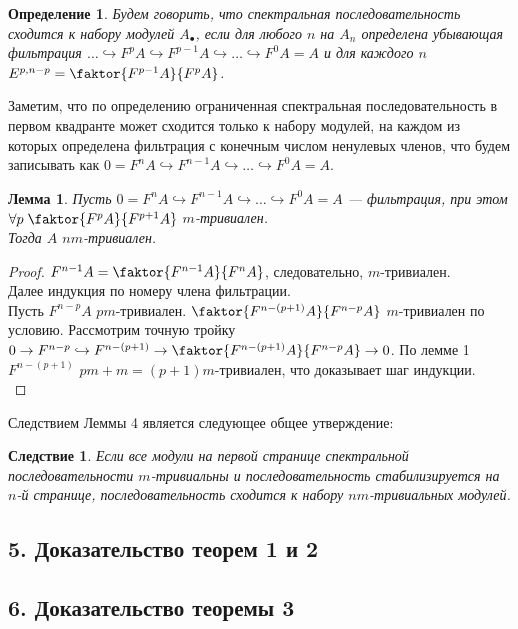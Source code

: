 \documentclass[a4paper,12pt]{report}
\newtheorem{lemma}{Лемма}
\newtheorem{corollary}{Следствие}
\newtheorem{definition}{Определение}
\begin{document}
\begin{definition}
  Будем говорить, что спектральная последовательность сходится к набору модулей $A_{\bullet}$,
  если для любого $n$ на $A_n$ определена убывающая фильтрация $\ldots \hookrightarrow  F^pA \hookrightarrow F^{p-1}A \hookrightarrow \ldots \hookrightarrow F^0A = A$ и для каждого $n$ $E^{p,n-p} = \faktor{F^{p-1}A}{F^pA}$.
\end{definition}

Заметим, что по определению ограниченная спектральная последовательность в первом квадранте может сходится только к набору модулей, на каждом из которых определена фильтрация с конечным числом ненулевых членов, что будем записывать как $0 = F^nA \hookrightarrow F^{n-1}A \hookrightarrow \ldots \hookrightarrow F^0A = A$.

\begin{lemma}
  Пусть $0 = F^nA \hookrightarrow F^{n-1}A \hookrightarrow \ldots \hookrightarrow F^0A = A$ --- фильтрация, при этом $\forall p\; \faktor{F^pA}{F^{p+1}A}$ $m$-тривиален.\\
  Тогда $A$ $nm$-тривиален.
\end{lemma}

\begin{proof}
  $F^{n-1}A = \faktor{F^{n-1}A}{F^nA}$, следовательно, $m$-тривиален.\\
  Далее индукция по номеру члена фильтрации.\\
  Пусть $F^{n-p}A$ $pm$-тривиален. $\faktor{F^{n-(p+1)}A}{F^{n-p}A}$ $m$-тривиален по условию. Рассмотрим точную тройку $0 \to F^{n-p} \hookrightarrow F^{n-(p+1)} \rightarrow \faktor{F^{n-(p+1)}A}{F^{n-p}A} \to 0$. По лемме 1 $F^{n-(p+1)}$ $pm+m=(p+1)m$-тривиален, что доказывает шаг индукции.\\
\end{proof}

Следствием Леммы 4 является следующее общее утверждение:
\begin{corollary}
  Если все модули на первой странице спектральной последовательности $m$-тривиальны и последовательность стабилизируется на $n$-й странице, последовательность сходится к набору $nm$-тривиальных модулей.
\end{corollary}

\subsection*{5. Доказательство теорем 1 и 2}

\subsection*{6. Доказательство теоремы 3}
\end{document}
